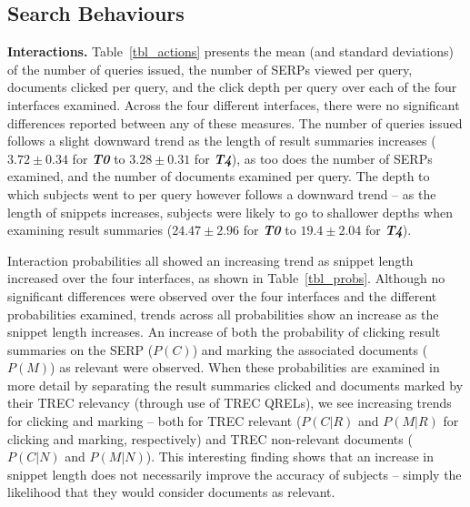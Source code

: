 

\subsection{Search Behaviours}\label{sec:results:behaviours}
\noindent\textbf{Interactions.} Table~\ref{tbl_actions} presents the mean (and standard deviations) of the number of queries issued, the number of SERPs viewed per query, documents clicked per query, and the click depth per query over each of the four interfaces examined. Across the four different interfaces, there were no significant differences reported between any of these measures. The number of queries issued follows a slight downward trend as the length of result summaries increases ($3.72\pm0.34$ for \textbf{\emph{T0}} to $3.28\pm0.31$ for \textbf{\emph{T4}}), as too does the number of SERPs examined, and the number of documents examined per query. The depth to which subjects went to per query however follows a downward trend -- as the length of snippets increases, subjects were likely to go to shallower depths when examining result summaries ($24.47\pm2.96$ for \textbf{\emph{T0}} to $19.4\pm2.04$ for \textbf{\emph{T4}}).

Interaction probabilities all showed an increasing trend as snippet length increased over the four interfaces, as shown in Table~\ref{tbl_probs}. Although no significant differences were observed over the four interfaces and the different probabilities examined, trends across all probabilities show an increase as the snippet length increases. An increase of both the probability of clicking result summaries on the SERP ($P(C)$) and marking the associated documents ($P(M)$) as relevant were observed. When these probabilities are examined in more detail by separating the result summaries clicked and documents marked by their TREC relevancy (through use of TREC QRELs), we see increasing trends for clicking and marking -- both for TREC relevant ($P(C|R)$ and $P(M|R)$ for clicking and marking, respectively) and TREC non-relevant documents ($P(C|N)$ and $P(M|N)$). This interesting finding shows that an increase in snippet length does not necessarily improve the accuracy of subjects -- simply the likelihood that they would consider documents as relevant.

